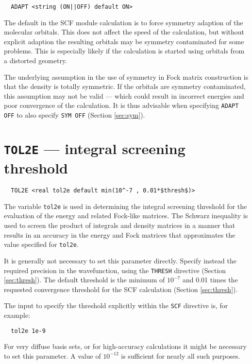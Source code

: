 \begin{verbatim}
  ADAPT <string (ON||OFF) default ON>
\end{verbatim}

The default in the SCF module calculation is to force symmetry
adaption of the molecular orbitals. This does not affect the speed of
the calculation, but without explicit adaption the resulting orbitals
may be symmetry contaminated for some problems.  This is especially
likely if the calculation is started using orbitals from a distorted
geometry.

The underlying assumption in the use of symmetry in Fock matrix
construction is that the density is totally symmetric.  If the orbitals
are symmetry contaminated, this assumption may not be valid --- which
could result in incorrect energies and poor convergence of the
calculation.  It is thus advisable when specifying \verb+ADAPT OFF+ to
also specify \verb+SYM OFF+ (Section \ref{sec:sym}).

\section{{\tt TOL2E} --- integral screening threshold}
\label{sec:tol2e}

\begin{verbatim}
  TOL2E <real tol2e default min(10^-7 , 0.01*$thresh$)>
\end{verbatim}

The variable \verb+tol2e+ is used in determining the integral
screening threshold for the evaluation of the energy and related
Fock-like matrices.  The Schwarz inequality is used to screen the
product of integrals and density matrices in a manner that results in
an accuracy in the energy and Fock matrices that approximates the
value specified for \verb+tol2e+. 

It is generally not necessary to set this parameter directly.  Specify
instead the required precision in the wavefunction, using the
\verb+THRESH+ directive (Section \ref{sec:thresh}). The default
threshold is the minimum of $10^{-7}$ and 0.01 times the requested
convergence threshold for the SCF calculation (Section
\ref{sec:thresh}).  

The input to specify the threshold explicitly within the \verb+SCF+
directive is, for example:

\begin{verbatim}
  tol2e 1e-9
\end{verbatim}

For very diffuse basis sets, or for high-accuracy calculations it
might be necessary to set this parameter.  A value of $10^{-12}$ is
sufficient for nearly all such purposes.

